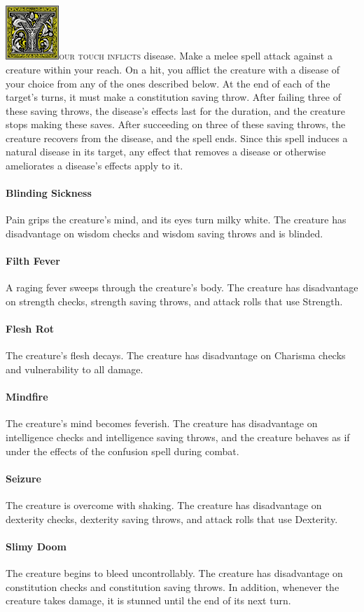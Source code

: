 \documentclass[12pt,showtrims]{memoir}
\begin{document}
\vspace{1\baselineskip}\noindent
\lettrine[lines=4]{\includegraphics[height=58pt]{initials/Y.png}}{our touch inflicts} disease. Make a melee spell attack against a creature within your reach. On a hit, you afflict the creature with a disease of your choice from any of the ones described below. At the end of each of the target's turns, it must make a constitution saving throw. After failing three of these saving throws, the disease's effects last for the duration, and the creature stops making these saves. After succeeding on three of these saving throws, the creature recovers from the disease, and the spell ends. Since this spell induces a natural disease in its target, any effect that removes a disease or otherwise ameliorates a disease's effects apply to it. \paragraph{Blinding Sickness} Pain grips the creature's mind, and its eyes turn milky white. The creature has disadvantage on wisdom checks and wisdom saving throws and is blinded. \paragraph{Filth Fever} A raging fever sweeps through the creature's body. The creature has disadvantage on strength checks, strength saving throws, and attack rolls that use Strength. \paragraph{Flesh Rot} The creature's flesh decays. The creature has disadvantage on Charisma checks and vulnerability to all damage. \paragraph{Mindfire} The creature's mind becomes feverish. The creature has disadvantage on intelligence checks and intelligence saving throws, and the creature behaves as if under the effects of the confusion spell during combat. \paragraph{Seizure} The creature is overcome with shaking. The creature has disadvantage on dexterity checks, dexterity saving throws, and attack rolls that use Dexterity. \paragraph{Slimy Doom} The creature begins to bleed uncontrollably. The creature has disadvantage on constitution checks and constitution saving throws. In addition, whenever the creature takes damage, it is stunned until the end of its next turn.
\end{document}
